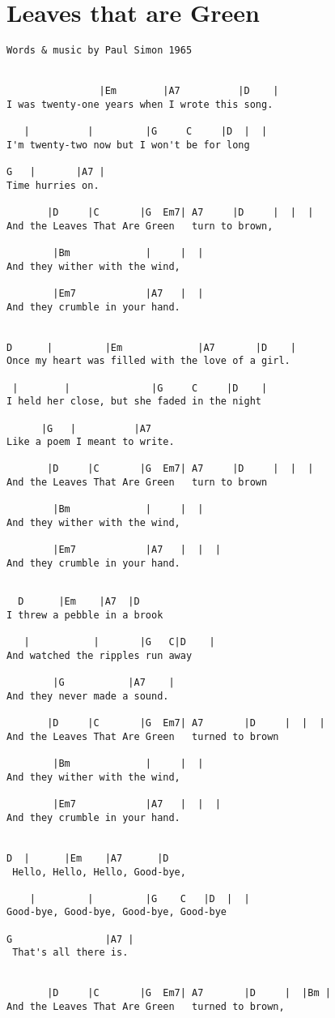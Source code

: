 \documentclass[leqno]{memoir}
\begin{document}
\chapter{Leaves that are Green}
\begin{verbatim}
Words & music by Paul Simon 1965


                |Em        |A7          |D    |
I was twenty-one years when I wrote this song.

   |          |         |G     C     |D  |  |
I'm twenty-two now but I won't be for long

G   |       |A7 |
Time hurries on.

       |D     |C       |G  Em7| A7     |D     |  |  |
And the Leaves That Are Green   turn to brown,

        |Bm             |     |  |
And they wither with the wind,

        |Em7            |A7   |  |
And they crumble in your hand.


D      |         |Em             |A7       |D    |
Once my heart was filled with the love of a girl.

 |        |              |G     C     |D    |  
I held her close, but she faded in the night

      |G   |          |A7
Like a poem I meant to write.

       |D     |C       |G  Em7| A7     |D     |  |  |
And the Leaves That Are Green   turn to brown

        |Bm             |     |  |
And they wither with the wind,

        |Em7            |A7   |  |  |
And they crumble in your hand.
\end{verbatim}
\newpage
\begin{verbatim}

  D      |Em    |A7  |D    
I threw a pebble in a brook

   |           |       |G   C|D    |
And watched the ripples run away

        |G           |A7    |
And they never made a sound.

       |D     |C       |G  Em7| A7       |D     |  |  |
And the Leaves That Are Green   turned to brown

        |Bm             |     |  |
And they wither with the wind,

        |Em7            |A7   |  |  |
And they crumble in your hand.


D  |      |Em    |A7      |D   
 Hello, Hello, Hello, Good-bye,

    |         |         |G    C   |D  |  |
Good-bye, Good-bye, Good-bye, Good-bye

G                |A7 |
 That's all there is.


       |D     |C       |G  Em7| A7       |D     |  |Bm |
And the Leaves That Are Green   turned to brown, 
\end{verbatim}
\newpage
\end{document}
